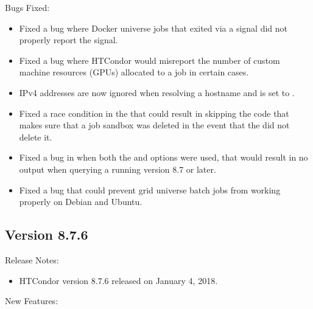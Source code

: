 \noindent Bugs Fixed:

\begin{itemize}

\item Fixed a bug where Docker universe jobs that exited via a signal
did not properly report the signal.

\item Fixed a bug where HTCondor would misreport the number of custom
machine resources (GPUs) allocated to a job in certain cases.

\item IPv4 addresses are now ignored when resolving a hostname and
 is set to .

\item Fixed a race condition in the  that could result in skipping the
code that makes sure that a job sandbox was deleted in the event that the  did
not delete it.

\item Fixed a bug in  when both the  and  options were used, that would
result in no output when querying a  running version 8.7 or later.

\item Fixed a bug that could prevent grid universe batch jobs from working
properly on Debian and Ubuntu.

\end{itemize}

\subsection*{\label{sec:New-8-7-6}Version 8.7.6}

\noindent Release Notes:

\begin{itemize}

\item HTCondor version 8.7.6 released on January 4, 2018.

\end{itemize}


\noindent New Features:

